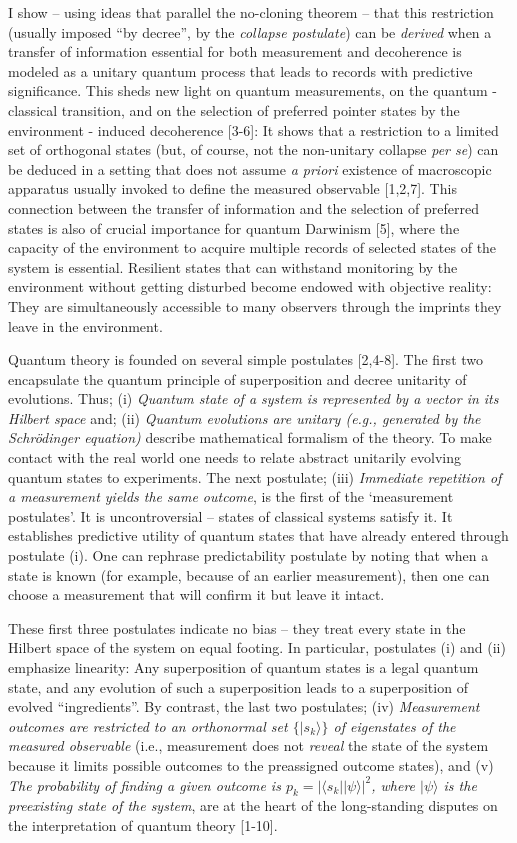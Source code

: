 \documentclass[aps,twocolumn,pra]{revtex4}
\newcommand{\bra}[1]    {\langle #1|}
\newcommand{\ket}[1]    {| #1 \rangle}
\newcommand{\+}         {\dagger}
\begin{document}
I show -- using ideas that parallel the no-cloning theorem -- that this restriction (usually imposed ``by decree'', by the {\em collapse postulate}) can be {\em derived} when a transfer of information essential for both measurement and decoherence is modeled as a unitary quantum process that leads to records with predictive significance. This sheds new light on quantum measurements, on the quantum - classical transition, and on the selection of preferred pointer states by the environment - induced decoherence [3-6]: It shows that a restriction to a limited set of orthogonal states (but, of course, not the non-unitary collapse {\em per se}) can be deduced in a setting that does not assume {\em a priori} existence of macroscopic apparatus usually invoked to define the measured observable [1,2,7]. This connection between the transfer of information and the selection of preferred states is also of crucial importance for quantum Darwinism [5], where the capacity of the environment to acquire multiple records of selected states of the system is essential. Resilient states that can withstand monitoring by the environment without getting disturbed become endowed with objective reality: They are simultaneously accessible to many observers through the imprints they leave in the environment.

Quantum theory is founded on several simple postulates [2,4-8]. The first two encapsulate the quantum principle of superposition and decree unitarity of evolutions. Thus; (i) {\it Quantum state of a system is represented by a vector in its Hilbert space} and; (ii) {\it Quantum evolutions are unitary (e.g., generated by the Schr\"odinger equation)} describe mathematical formalism of the theory. To make contact with the real world one needs to relate abstract unitarily evolving quantum states to experiments. The next postulate; (iii) {\it Immediate repetition of a measurement yields the same outcome}, is the first 
of the `measurement postulates'. It is uncontroversial -- states of classical systems satisfy it. It establishes predictive utility of quantum states that have already entered through postulate (i). One can rephrase predictability postulate by noting that when a state is known (for example, because of an earlier
measurement), then one can choose a measurement that will confirm it but leave it intact. 

These first three postulates indicate no bias -- they treat every state in the Hilbert space of the system 
on equal footing. In particular, postulates (i) and (ii) emphasize linearity: Any superposition of quantum states is a legal quantum state, and any evolution of such a superposition leads to a superposition 
of evolved ``ingredients''. By contrast, the last two postulates; (iv) {\it Measurement outcomes are restricted to an orthonormal set $\{\ket {s_k}\}$ of eigenstates of the measured observable} (i.e., measurement does not {\it reveal} the state of the system because it limits possible outcomes to the
preassigned outcome states), and (v) {\it The probability of finding a given outcome is $p_k=|\bra {s_k} \ket \psi|^2$, where $\ket \psi$ is the preexisting state of the system}, are at the heart of the long-standing disputes on the interpretation of quantum theory [1-10]. 
\end{document}
